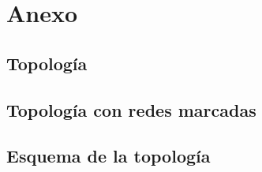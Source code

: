 \documentclass[12pt, a4paper, spanish]{article}
\begin{document}
\newpage
\section{Anexo}
\subsection{Topología}
\subsection{Topología con redes marcadas}

\subsection{Esquema de la topología}
\end{document}

